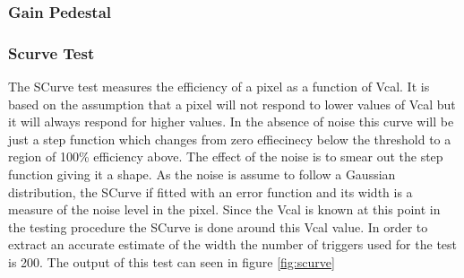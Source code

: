 \subsubsection{Gain Pedestal}


\subsubsection{Scurve Test}
The SCurve test measures the efficiency of a pixel as a function of Vcal. It is based on the assumption that a pixel will not respond to lower values of Vcal but it will always respond for higher values. In the absence of noise this curve will be just a step function which changes from zero effiecinecy below the threshold to a region of 100\% efficiency above. The effect of the noise is to smear out the step function giving it a  shape. As the noise is assume to follow a Gaussian distribution, the SCurve if fitted with an error function and its width is a measure of the noise level in the pixel. Since the Vcal is known at this point in the testing procedure the SCurve is done around this Vcal value. In order to extract an accurate estimate of the width the number of triggers used for the test is 200. The output of this test can seen in figure \ref{fig:scurve}

